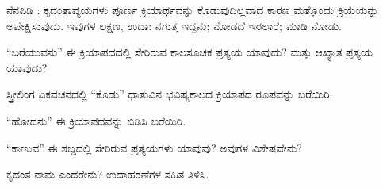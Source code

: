 \indent ನೆನಪಿಡಿ : ಕೃದಂತಾವ್ಯಯಗಳು ಪೂರ್ಣ ಕ್ರಿಯಾರ್ಥವನ್ನು ಕೊಡುವುದಿಲ್ಲವಾದ ಕಾರಣ ಮತ್ತೊಂದು ಕ್ರಿಯೆಯನ್ನು ಅಪೇಕ್ಷಿಸುವುದು. ಇವುಗಳ ಲಕ್ಷಣ, ಉದಾ: ನಗುತ್ತ ಇದ್ದನು; ನೋಡದೆ ಇರಲಾರೆ; ಮಾಡಿ ನೋಡು.\par


\vspace{2.5pt plus 3pt minus 0.5pt}\noindent\hspace*{1.2em}\hspace{0.55em}“ಬರೆಯುವನು” ಈ ಕ್ರಿಯಾಪದದಲ್ಲಿ ಸೇರಿರುವ ಕಾಲಸೂಚಕ ಪ್ರತ್ಯಯ ಯಾವುದು? ಮತ್ತು ಆಖ್ಯಾತ ಪ್ರತ್ಯಯ ಯಾವುದು?\par

\vspace{2.5pt plus 3pt minus 0.5pt}\noindent\hspace*{1.2em}\hspace{0.55em}ಸ್ತ್ರೀಲಿಂಗ ಏಕವಚನದಲ್ಲಿ “ಕೊಡು” ಧಾತುವಿನ ಭವಿಷ್ಯಕಾಲದ ಕ್ರಿಯಾಪದ ರೂಪವನ್ನು ಬರೆಯಿರಿ.\par

\vspace{2.5pt plus 3pt minus 0.5pt}\noindent\hspace*{1.2em}\hspace{0.55em}“ಹೋದನು” ಈ ಕ್ರಿಯಾಪದವನ್ನು ಬಿಡಿಸಿ ಬರೆಯಿರಿ.\par

\vspace{2.5pt plus 3pt minus 0.5pt}\noindent\hspace*{1.2em}\hspace{0.55em}“ಕಾಣುವ” ಈ ಶಬ್ದದಲ್ಲಿ ಸೇರಿರುವ ಪ್ರತ್ಯಯಗಳು ಯಾವುವು? ಅವುಗಳ ವಿಶೇಷವೇನು?\par

\vspace{2.5pt plus 3pt minus 0.5pt}\noindent\hspace*{1.2em}\hspace{0.55em}ಕೃದಂತ ನಾಮ ಎಂದರೇನು? ಉದಾಹರಣೆಗಳ ಸಹಿತ ತಿಳಿಸಿ.\par

